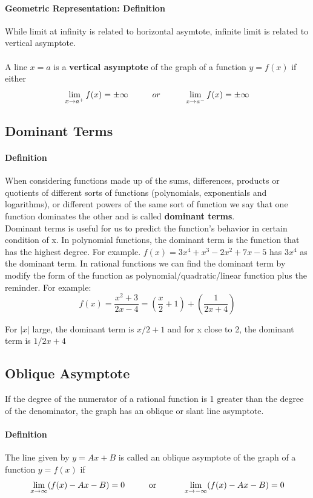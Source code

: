 \documentclass[12pt]{article}
\newcommand\tab[1][1cm]{\hspace*{#1}}
\begin{document}
\paragraph{Geometric Representation: Definition} While limit at infinity is related to horizontal asymtote, infinite limit
is related to vertical asymptote. \\ \\
\noindent
A line $x = a$ is a \textbf{vertical asymptote} of the graph of a function $y = f(x)$ if either
\[
    \lim_{x \to a^{+}} f(x) = \pm \infty \textrm{\tab} or \textrm{\tab} \lim_{x \to a^{-}} f(x) = \pm \infty 
\]

\subsection{Dominant Terms}
\paragraph{Definition} 
When considering functions made up of the sums, differences, products or quotients of different sorts of functions (polynomials, exponentials and logarithms), or 
different powers of the same sort of function we say that one function dominates the other and is called \textbf{dominant terms}. \\

\noindent
Dominant terms is useful for us to predict the function's behavior in certain condition of x. In polynomial functions, the dominant term is the function that has 
the highest degree. For example. $f(x) = 3x^4 + x^3 - 2x^2 + 7x - 5$ has $3x^4$ as the dominant term. In rational functions we can find the dominant term by modify the
form of the function as polynomial/quadratic/linear function plus the reminder. For example:
\[
    f(x) = \frac{x^2 + 3}{2x - 4} = \left(\frac{x}{2} + 1\right) + \left(\frac{1}{2x + 4}\right)
\]

For $|x|$ large, the dominant term is $x/2 + 1$ and for x close to 2, the dominant term is $1/2x + 4$
\subsection{Oblique Asymptote}
If the degree of the numerator of a rational function is 1 greater than the degree of the
denominator, the graph has an oblique or slant line asymptote. 

\paragraph{Definition}
The line given by $y = Ax + B$ is called an oblique asymptote of the graph of a function $y = f(x)$ if
\[
    \lim_{x \to \infty} (f(x) - Ax - B) = 0 \textrm{\tab or \tab} \lim_{x \to -\infty} (f(x) - Ax - B) = 0
\]
\end{document}

